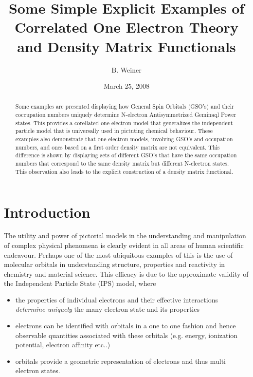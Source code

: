 \documentclass[aps,preprint]{revtex4}%
\begin{document}
\preprint{ }
\title{Some Simple Explicit Examples of Correlated One Electron Theory and Density
Matrix Functionals }
\author{B. Weiner}

\pacs{}

\begin{abstract}
Some examples are presented displaying how General Spin Orbitals (GSO's) and
their coccupation numbers uniquely determine N-electron Antisymmetrized
Geminaql Power states. This provides a corellated one electron model that
generalizes the independent particle model that is universally used in
pictuting chemical behaviour. These examples also demonstrate that one
electron models, involving GSO's and occupation numbers, and ones based on a
first order density matrix are not equivalent. This difference is shown by
displaying sets of different GSO's that have the same occupation numbers that
correspond to the same density matrix but different N-electron states. This
observation also leads to the explicit construction of a density matrix functional.

\end{abstract}
\date{March 25, 2008}
\maketitle
\tableofcontents


\section{Introduction\label{Intro}}

The utility and power of pictorial models in the understanding and
manipulation of complex physical phenomena is clearly evident in all areas of
human scientific endeavour. Perhaps one of the most ubiquitous examples of
this is the use of molecular orbitals in understanding structure, properties
and reactivity in chemistry and material science. This efficacy is due to the
approximate validity of the Independent Particle State (IPS) model, where

\begin{itemize}
\item the properties of individual electrons and their effective interactions
\emph{determine uniquely} the many electron state and its properties

\item electrons can be identified with orbitals in a one to one fashion and
hence observable quantities associated with these orbitals (e.g. energy,
ionization potential, electron affinity etc..)

\item orbitals provide a geometric representation of electrons and thus multi
electron states.
\end{itemize}
\end{document}
